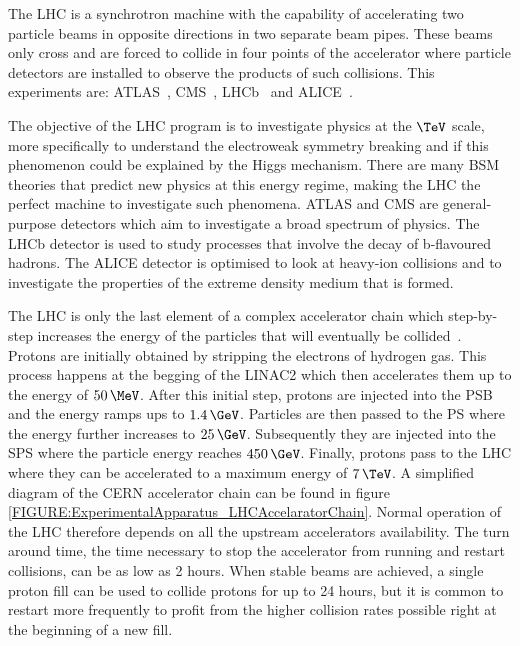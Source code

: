 The \gls{LHC} is a synchrotron machine with the capability of accelerating two particle beams in opposite directions in two separate beam pipes. These beams only cross and are forced to collide in four points of the accelerator where particle detectors are installed to observe the products of such collisions. This experiments are: \gls{ATLAS}~\cite{ARTICLE:TheATLASExperiment}, \gls{CMS}~\cite{ARTICLE:TheCMSExperiment}, \gls{LHCb}~\cite{ARTICLE:TheLHCbExperiment} and \gls{ALICE}~\cite{ARTICLE:TheALICEExperiment}.

The objective of the \gls{LHC} program is to investigate physics at the $\TeV$ scale, more specifically to understand the electroweak symmetry breaking and if this phenomenon could be explained by the Higgs mechanism. There are many \gls{BSM} theories that predict new physics at this energy regime, making the \gls{LHC} the perfect machine to investigate such phenomena. \gls{ATLAS} and \gls{CMS} are general-purpose detectors which aim to investigate a broad spectrum of physics. The \gls{LHCb} detector is used to study processes that involve the decay of b-flavoured hadrons. The \gls{ALICE} detector is optimised to look at heavy-ion collisions and to investigate the properties of the extreme density medium that is formed.

The \gls{LHC} is only the last element of a complex accelerator chain which step-by-step increases the energy of the particles that will eventually be collided~\cite{ARTICLE:LHCMachine}. Protons are initially obtained by stripping the electrons of hydrogen gas. This process happens at the begging of the \gls{LINAC2} which then accelerates them up to the energy of $50\,\MeV$. After this initial step, protons are injected into the \gls{PSB} and the energy ramps ups to $1.4\,\GeV$. Particles are then passed to the \gls{PS} where the energy further increases to $25\,\GeV$. Subsequently they are injected into the \gls{SPS} where the particle energy reaches $450\,\GeV$. Finally, protons pass to the \gls{LHC} where they can be accelerated to a maximum energy of $7\,\TeV$. A simplified diagram of the \gls{CERN} accelerator chain can be found in figure \ref{FIGURE:ExperimentalApparatus_LHCAccelaratorChain}. 
Normal operation of the \gls{LHC} therefore depends on all the upstream accelerators availability. The turn around time, the time necessary to stop the accelerator from running and restart collisions, can be as low as 2 hours. When stable beams are achieved, a single proton fill can be used to collide protons for up to 24 hours, but it is common to restart more frequently to profit from the higher collision rates possible right at the beginning of a new fill.

